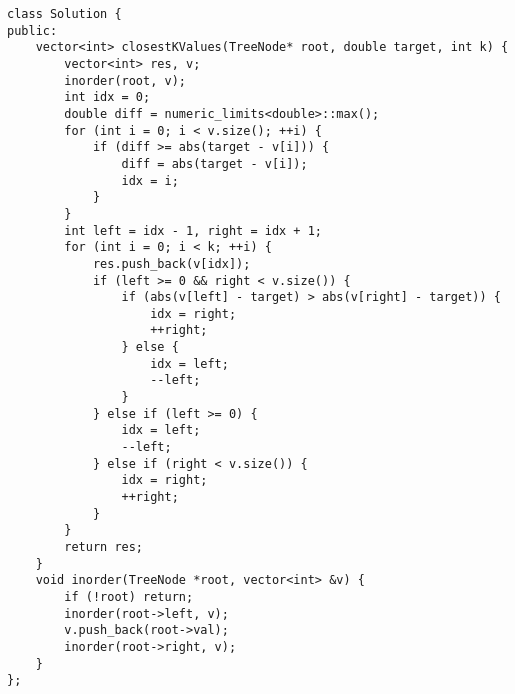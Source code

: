 \begin{lstlisting}
class Solution {
public:
    vector<int> closestKValues(TreeNode* root, double target, int k) {
        vector<int> res, v;
        inorder(root, v);
        int idx = 0;
        double diff = numeric_limits<double>::max();
        for (int i = 0; i < v.size(); ++i) {
            if (diff >= abs(target - v[i])) {
                diff = abs(target - v[i]);
                idx = i;
            }
        }
        int left = idx - 1, right = idx + 1;
        for (int i = 0; i < k; ++i) {
            res.push_back(v[idx]);
            if (left >= 0 && right < v.size()) {
                if (abs(v[left] - target) > abs(v[right] - target)) {
                    idx = right;
                    ++right;
                } else {
                    idx = left;
                    --left;
                }
            } else if (left >= 0) {
                idx = left;
                --left;
            } else if (right < v.size()) {
                idx = right;
                ++right;
            }
        }
        return res;
    }
    void inorder(TreeNode *root, vector<int> &v) {
        if (!root) return;
        inorder(root->left, v);
        v.push_back(root->val);
        inorder(root->right, v);
    }
};
\end{lstlisting}





